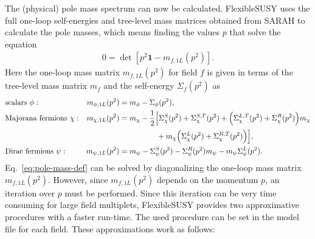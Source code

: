 \documentclass[final,3p,11pt,pdflatex]{elsarticle}
\makeatletter
\newcommand{\fs}{FlexibleSUSY\@\xspace}
\newcommand{\unity}{\mathbf{1}}
\makeatother
\begin{document}
The (physical) pole mass spectrum can now be calculated.  \fs uses the
full one-loop self-energies and tree-level mass matrices obtained from
SARAH to calculate the pole masses, which means finding the values $p$
that solve the equation
%
\begin{align}
  0 = \det\left[p^2\unity - m_{f,1L}(p^2)\right].
  \label{eq:pole-mass-def}
\end{align}
%
Here the one-loop mass matrix $m_{f,1L}(p^2)$ for field $f$ is given
in terms of the tree-level mass matrix $m_f$ and the self-energy
$\Sigma_f(p^2)$ as
%
\begin{align}
  &\text{scalars } \phi: &
  m_{\phi,1L}(p^2) &= m_{\phi} - \Sigma_\phi(p^2), \\
  &\text{Majorana fermions } \chi: &
  m_{\chi,1L}(p^2) &= m_{\chi} - \frac{1}{2}\Big[
    \Sigma_\chi^S(p^2) + \Sigma_\chi^{S,T}(p^2)
    + \Big( \Sigma_\chi^{L,T}(p^2) + \Sigma_\chi^R(p^2) \Big) m_{\chi} \notag \\
    &&&\phantom{= m_{\chi} - \frac{1}{2}\Big[}
    + m_{\chi} \Big( \Sigma_\chi^L(p^2) + \Sigma_\chi^{R,T}(p^2) \Big)
  \Big], \\
  &\text{Dirac fermions } \psi: &
  m_{\psi,1L}(p^2) &= m_{\psi}
  - \Sigma_\psi^S(p^2)
  - \Sigma_\psi^R(p^2) m_{\psi}
  - m_{\psi} \Sigma_\psi^L(p^2) .
\end{align}
%
Eq.~\eqref{eq:pole-mass-def} can be solved by diagonalizing the
one-loop mass matrix $m_{f,1L}(p^2)$.  However, since $m_{f,1L}(p^2)$
depends on the momentum $p$, an iteration over $p$ must be performed.
Since this iteration can be very time consuming for large field
multiplets, \fs provides two approximative procedures with a faster
run-time.  The used procedure can be set in the model file for each
field.  These approximations work as follows:
%
\end{document}
